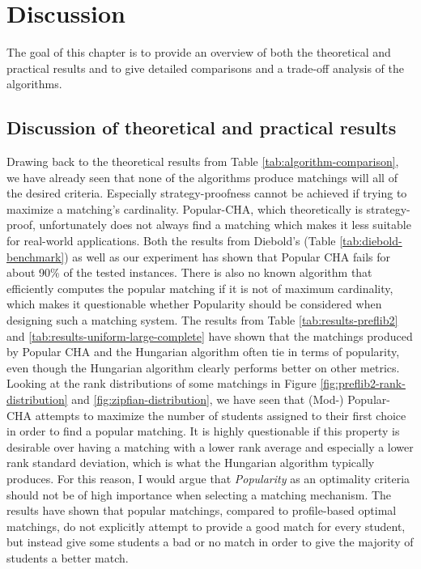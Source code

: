 \section{Discussion}

The goal of this chapter is to provide an overview of both the theoretical and practical results and to give detailed comparisons and a trade-off analysis of the algorithms.

\subsection{Discussion of theoretical and practical results}
Drawing back to the theoretical results from Table \ref{tab:algorithm-comparison}, we have already seen that none of the algorithms produce matchings will all of the desired criteria. Especially strategy-proofness cannot be achieved if trying to maximize a matching's cardinality. Popular-CHA, which theoretically is strategy-proof, unfortunately does not always find a matching which makes it less suitable for real-world applications. Both the results from Diebold's (Table \ref{tab:diebold-benchmark}) as well as our experiment has shown that Popular CHA fails for about 90\% of the tested instances. There is also no known algorithm that efficiently computes the popular matching if it is not of maximum cardinality, which makes it questionable whether Popularity should be considered when designing such a matching system. The results from Table \ref{tab:results-preflib2} and \ref{tab:results-uniform-large-complete} have shown that the matchings produced by Popular CHA and the Hungarian algorithm often tie in terms of popularity, even though the Hungarian algorithm clearly performs better on other metrics. Looking at the rank distributions of some matchings in Figure \ref{fig:preflib2-rank-distribution} and \ref{fig:zipfian-distribution}, we have seen that (Mod-) Popular-CHA attempts to maximize the number of students assigned to their first choice in order to find a popular matching. It is highly questionable if this property is desirable over having a matching with a lower rank average and especially a lower rank standard deviation, which is what the Hungarian algorithm typically produces. For this reason, I would argue that \emph{Popularity} as an optimality criteria should not be of high importance when selecting a matching mechanism. The results have shown that popular matchings, compared to profile-based optimal matchings, do not explicitly attempt to provide a good match for every student, but instead give some students a bad or no match in order to give the majority of students a better match.

